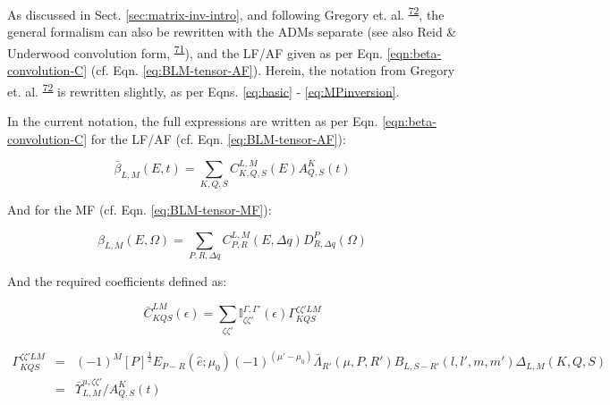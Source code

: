 \documentclass[10pt]{article}
\begin{document}


As discussed in Sect. \ref{sec:matrix-inv-intro}, and following Gregory et. al. \textsuperscript{\hyperref[csl:72]{72}}, the general formalism can also be rewritten with the ADMs separate (see also Reid \& Underwood convolution form, \textsuperscript{\hyperref[csl:71]{71}}), and the LF/AF given as per Eqn. \ref{eqn:beta-convolution-C} (cf. Eqn. \ref{eq:BLM-tensor-AF}). Herein, the notation from Gregory et. al. \textsuperscript{\hyperref[csl:72]{72}} is rewritten slightly, as per Eqns. \ref{eq:basic} - \ref{eq:MPinversion}.

In the current notation, the full expressions are written as per Eqn. \ref{eqn:beta-convolution-C} for the LF/AF (cf. Eqn. \ref{eq:BLM-tensor-AF}):

\begin{equation}
\bar{\beta}_{L,M}(E,t)=\sum_{K,Q,S}C_{K,Q,S}^{L,M}(E)A_{Q,S}^{K}(t)
\end{equation}


And for the MF (cf. Eqn. \ref{eq:BLM-tensor-MF}):

\begin{equation}
\beta_{L,M}(E,\Omega)=\sum_{P,R,\Delta q}C_{P,R}^{L,M}(E,\Delta q)D_{R,\Delta q}^{P}(\Omega)
\end{equation}

And the required coefficients defined as:

\begin{equation}
\bar{C}_{KQS}^{LM}(\epsilon)=\sum_{\zeta\zeta'}\mathbb{I}_{\zeta\zeta'}^{\Gamma,\Gamma'}(\epsilon)\Gamma_{KQS}^{\zeta\zeta'LM}
\end{equation}

\begin{eqnarray}
\Gamma_{KQS}^{\zeta\zeta'LM} & = & (-1)^{M}[P]^{\frac{1}{2}}E_{P-R}(\hat{e};\mu_{0})(-1)^{(\mu'-\mu_{0})}\bar{\Lambda}_{R'}(\mu,P,R')B_{L,S-R'}(l,l',m,m')\Delta_{L,M}(K,Q,S)\\
 & = & \bar{\varUpsilon}_{L,M}^{u,\zeta\zeta'}/A_{Q,S}^{K}(t)
\end{eqnarray}
\end{document}
